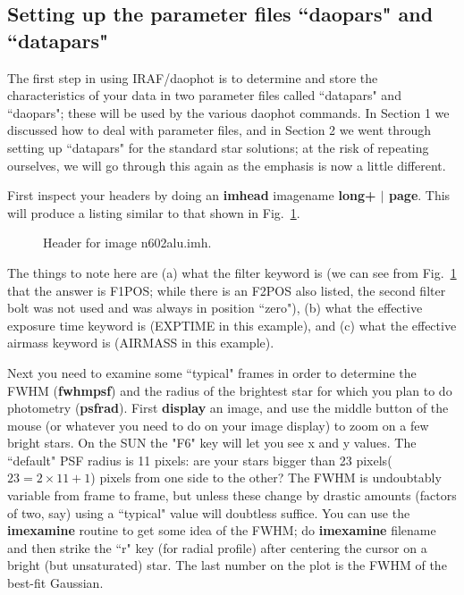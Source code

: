 \subsection{Setting up the parameter files ``daopars" and ``datapars" }
 
The first step in using IRAF/daophot is to determine and store the
characteristics of your data in two parameter files called ``datapars"
and ``daopars"; these will be used by the various daophot commands.
In Section 1 we discussed how to deal with parameter files, and 
in Section 2 we went through setting up ``datapars" for the standard
star solutions; at the risk of repeating ourselves, we will go through
this again as the emphasis is now a little different.

 
First inspect your headers by doing an {\bf imhead} imagename {\bf long+
$|$ page}.  
This will produce a listing similar to that shown in Fig.~\ref{newhead}.
\begin{figure}
\vspace{3.0in}
\caption{\label{newhead}Header for image n602alu.imh.}
\end{figure}
The things to note here are (a) what the filter keyword is (we can
see from Fig.~\ref{newhead} that the answer is F1POS; while there is
an F2POS also listed, the second filter bolt was not used and was always
in position ``zero"),
(b) what the effective exposure
time keyword is (EXPTIME in this example), and (c) what the effective
airmass keyword is (AIRMASS in this example).
 
Next you need to examine some ``typical" frames in order to determine
the FWHM ({\bf fwhmpsf}) and the radius of the brightest star for which
you plan to do photometry ({\bf psfrad}).
First {\bf display} an image, and use the
middle button of the mouse (or whatever you need to do on your image
display) to zoom on a few bright stars.  On the SUN the "F6" key will
let you see x and y values.  The ``default" PSF radius is 11 pixels:
are your stars bigger than 23 pixels($23=2 \times 11 + 1$)
pixels from one side to the other?  The FWHM is undoubtably variable
from frame to frame, but unless these change by drastic amounts (factors
of two, say) using a ``typical" value will doubtless suffice.  You can
use the {\bf imexamine} routine to get some idea of the FWHM; do
{\bf imexamine} filename and then strike the ``r" key (for radial
profile) after centering the cursor on a bright (but unsaturated) star.
The last number on the plot is the FWHM of the best-fit Gaussian.
 
